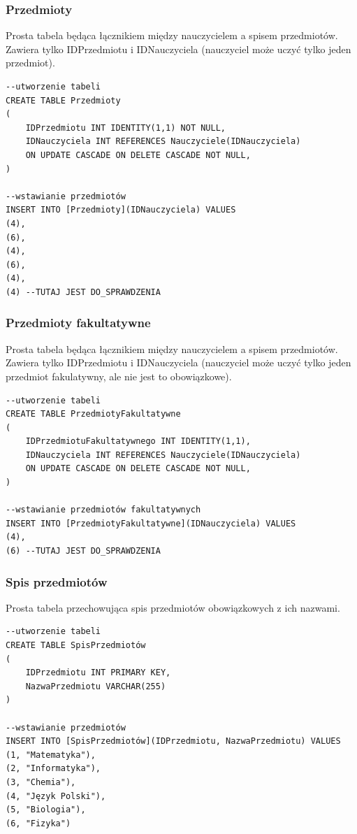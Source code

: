 \documentclass[60pt]{article}
\begin{document}
\subsubsection{Przedmioty}
 Prosta tabela będąca łącznikiem między nauczycielem a spisem przedmiotów. Zawiera tylko IDPrzedmiotu i IDNauczyciela (nauczyciel może uczyć tylko jeden przedmiot).
 
 \begin{verbatim}
--utworzenie tabeli
CREATE TABLE Przedmioty
(
	IDPrzedmiotu INT IDENTITY(1,1) NOT NULL,
	IDNauczyciela INT REFERENCES Nauczyciele(IDNauczyciela) 
	ON UPDATE CASCADE ON DELETE CASCADE NOT NULL,
)

--wstawianie przedmiotów
INSERT INTO [Przedmioty](IDNauczyciela) VALUES
(4),
(6), 
(4),
(6), 
(4),
(4) --TUTAJ JEST DO_SPRAWDZENIA
\end{verbatim}

\subsubsection{Przedmioty fakultatywne}
 Prosta tabela będąca łącznikiem między nauczycielem a spisem przedmiotów. Zawiera tylko IDPrzedmiotu i IDNauczyciela (nauczyciel może uczyć tylko jeden przedmiot fakulatywny, ale nie jest to obowiązkowe).
 
 \begin{verbatim}
--utworzenie tabeli
CREATE TABLE PrzedmiotyFakultatywne
(
	IDPrzedmiotuFakultatywnego INT IDENTITY(1,1),
	IDNauczyciela INT REFERENCES Nauczyciele(IDNauczyciela) 
	ON UPDATE CASCADE ON DELETE CASCADE NOT NULL,
)

--wstawianie przedmiotów fakultatywnych
INSERT INTO [PrzedmiotyFakultatywne](IDNauczyciela) VALUES
(4),
(6) --TUTAJ JEST DO_SPRAWDZENIA
\end{verbatim}

\subsubsection{Spis przedmiotów}
Prosta tabela przechowująca spis przedmiotów obowiązkowych z ich nazwami.

 \begin{verbatim}
--utworzenie tabeli
CREATE TABLE SpisPrzedmiotów
(
	IDPrzedmiotu INT PRIMARY KEY,
	NazwaPrzedmiotu VARCHAR(255)
)

--wstawianie przedmiotów
INSERT INTO [SpisPrzedmiotów](IDPrzedmiotu, NazwaPrzedmiotu) VALUES
(1, "Matematyka"),
(2, "Informatyka"),
(3, "Chemia"),
(4, "Język Polski"),
(5, "Biologia"),
(6, "Fizyka")
\end{verbatim}
\end{document}
